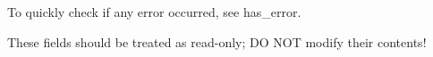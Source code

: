 To quickly check if any error occurred, see {\ttfamily has\-\_\-error}.

These fields should be treated as read-\/only; D\-O N\-O\-T modify their contents! 